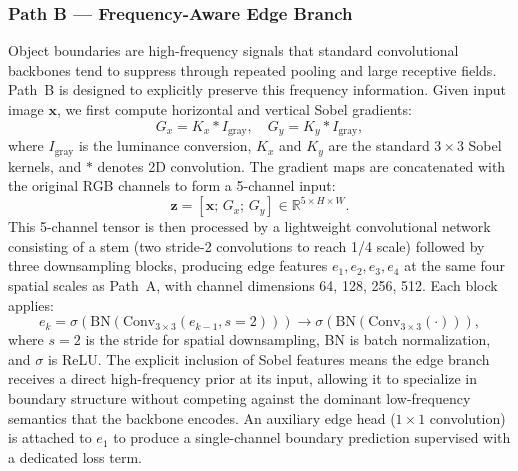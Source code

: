 \documentclass[conference]{IEEEtran}
\begin{document}
\subsubsection{Path B --- Frequency-Aware Edge Branch}
Object boundaries are high-frequency signals that standard convolutional backbones tend to suppress
through repeated pooling and large receptive fields. Path~B is designed to explicitly preserve this frequency
information. Given input image $\mathbf{x}$, we first compute horizontal and vertical Sobel gradients:
\begin{equation}
  G_x = K_x * I_{\mathrm{gray}}, \quad G_y = K_y * I_{\mathrm{gray}},
  \label{eq:sobel}
\end{equation}
where $I_{\mathrm{gray}}$ is the luminance conversion, $K_x$ and $K_y$ are the
standard $3\!\times\!3$ Sobel kernels, and $*$ denotes 2D convolution. The gradient maps are concatenated with the original RGB channels to form a
5-channel input:
\begin{equation}
  \mathbf{z} = [\mathbf{x};\,G_x;\,G_y] \in \mathbb{R}^{5\times H\times W}.
  \label{eq:5ch}
\end{equation}
This 5-channel tensor is then processed by a lightweight convolutional network consisting of a stem (two
stride-2 convolutions to reach 1/4 scale) followed by three downsampling blocks, producing edge features
$e_1, e_2, e_3, e_4$ at the same four spatial scales as Path~A, with channel dimensions 64, 128, 256, 512. Each
block applies:
\begin{equation}
  e_k = \sigma\!\left(\mathrm{BN}\!\left(\mathrm{Conv}_{3\times3}(e_{k-1},
        s\!=\!2)\right)\right)
        \!\to\!
        \sigma\!\left(\mathrm{BN}\!\left(\mathrm{Conv}_{3\times3}(\cdot)\right)\right),
  \label{eq:edgeblock}
\end{equation}
where $s=2$ is the stride for spatial downsampling, BN is batch normalization, and $\sigma$ is ReLU. The explicit
inclusion of Sobel features means the edge branch receives a direct high-frequency prior at its input,
allowing it to specialize in boundary structure without competing against the dominant low-frequency
semantics that the backbone encodes. An auxiliary edge head ($1\!\times\!1$ convolution) is attached to $e_1$ to
produce a single-channel boundary prediction supervised with a dedicated loss term.
\end{document}
